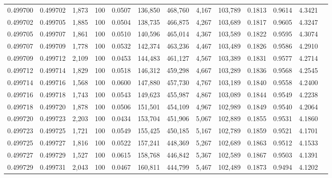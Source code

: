 \begin{tabular}{rrrrrrrrrrrrr}
0.499700 & 0.499702 & 1,873 & 100 &                                     0.0507 & 136,850 & 468,760 &   4,167 & 103,789 & 0.1813 & 0.9614 & 4.3421 \\
0.499702 & 0.499705 & 1,885 & 100 &                                     0.0504 & 138,735 & 466,875 &   4,267 & 103,689 & 0.1817 & 0.9605 & 4.3247 \\
0.499705 & 0.499707 & 1,861 & 100 &                                     0.0510 & 140,596 & 465,014 &   4,367 & 103,589 & 0.1822 & 0.9595 & 4.3074 \\
0.499707 & 0.499709 & 1,778 & 100 &                                     0.0532 & 142,374 & 463,236 &   4,467 & 103,489 & 0.1826 & 0.9586 & 4.2910 \\
0.499709 & 0.499712 & 2,109 & 100 &                                     0.0453 & 144,483 & 461,127 &   4,567 & 103,389 & 0.1831 & 0.9577 & 4.2714 \\
0.499712 & 0.499714 & 1,829 & 100 &                                     0.0518 & 146,312 & 459,298 &   4,667 & 103,289 & 0.1836 & 0.9568 & 4.2545 \\
0.499714 & 0.499716 & 1,568 & 100 &                                     0.0600 & 147,880 & 457,730 &   4,767 & 103,189 & 0.1840 & 0.9558 & 4.2400 \\
0.499716 & 0.499718 & 1,743 & 100 &                                     0.0543 & 149,623 & 455,987 &   4,867 & 103,089 & 0.1844 & 0.9549 & 4.2238 \\
0.499718 & 0.499720 & 1,878 & 100 &                                     0.0506 & 151,501 & 454,109 &   4,967 & 102,989 & 0.1849 & 0.9540 & 4.2064 \\
0.499720 & 0.499723 & 2,203 & 100 &                                     0.0434 & 153,704 & 451,906 &   5,067 & 102,889 & 0.1855 & 0.9531 & 4.1860 \\
0.499723 & 0.499725 & 1,721 & 100 &                                     0.0549 & 155,425 & 450,185 &   5,167 & 102,789 & 0.1859 & 0.9521 & 4.1701 \\
0.499725 & 0.499727 & 1,816 & 100 &                                     0.0522 & 157,241 & 448,369 &   5,267 & 102,689 & 0.1863 & 0.9512 & 4.1533 \\
0.499727 & 0.499729 & 1,527 & 100 &                                     0.0615 & 158,768 & 446,842 &   5,367 & 102,589 & 0.1867 & 0.9503 & 4.1391 \\
0.499729 & 0.499731 & 2,043 & 100 &                                     0.0467 & 160,811 & 444,799 &   5,467 & 102,489 & 0.1873 & 0.9494 & 4.1202 \\

\end{tabular}
